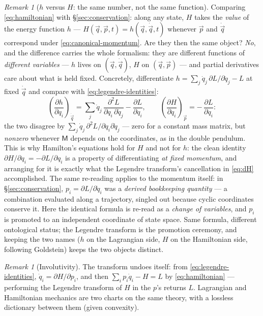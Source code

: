 \documentclass[11pt]{article}
\theoremstyle{plain}
\theoremstyle{definition}
\theoremstyle{remark}
\newtheorem{remark}[theorem]{Remark}
\newcommand{\pd}[2]{\frac{\partial #1}{\partial #2}}
\newcommand{\vq}{\vec{q}}
\newcommand{\vp}{\vec{p}}
\newcommand{\mM}{\mathsf{M}}
\begin{document}
\begin{remark}[$h$ versus $H$: the same number, not the same function]
\label{rem:h-vs-H}
Comparing \eqref{eq:hamiltonian} with \S\ref{sec:conservation}: along
any state, $H$ takes the \emph{value} of the energy function $h$ ---
$H(\vq, \vp, t) = h(\vq, \dot\vq, t)$ whenever $\vp$ and $\dot\vq$
correspond under \eqref{eq:canonical-momentum}. Are they then the same
object? \emph{No}, and the difference carries the whole formalism: they
are different functions of \emph{different variables} --- $h$ lives on
$(\vq, \dot\vq)$, $H$ on $(\vq, \vp)$ --- and partial derivatives care
about what is held fixed. Concretely, differentiate
$h = \sum_j \dot q_j\,\partial L/\partial\dot q_j - L$ at fixed
$\dot\vq$ and compare with \eqref{eq:legendre-identities}:
\begin{equation}
  \left(\pd{h}{q_i}\right)_{\!\dot\vq}
  = \sum_j \dot q_j\,
    \frac{\partial^2 L}{\partial q_i\,\partial \dot q_j}
  - \pd{L}{q_i},
  \qquad
  \left(\pd{H}{q_i}\right)_{\!\vp}
  = -\,\pd{L}{q_i} :
\end{equation}
the two disagree by
$\sum_j \dot q_j\,\partial^2 L/\partial q_i\partial\dot q_j$ ---
zero for a constant mass matrix, but \emph{nonzero} whenever
$\mM$ depends on the coordinates, as in the double pendulum. This is why
Hamilton's equations hold for $H$ and not for $h$: the clean identity
$\partial H/\partial q_i = -\partial L/\partial q_i$ is a property of
differentiating \emph{at fixed momentum}, and arranging for it is
exactly what the Legendre transform's cancellation in \eqref{eq:dH}
accomplished. The same re-reading applies to the momentum itself:
in \S\ref{sec:conservation}, $p_i = \partial L/\partial\dot q_i$ was a
\emph{derived bookkeeping quantity} --- a combination evaluated along a
trajectory, singled out because cyclic coordinates conserve it. Here the
identical formula is re-read as a \emph{change of variables}, and $p_i$
is promoted to an independent coordinate of state space. Same formula,
different ontological status; the Legendre transform is the promotion
ceremony, and keeping the two names ($h$ on the Lagrangian side, $H$ on
the Hamiltonian side, following Goldstein) keeps the two objects
distinct.
\end{remark}

\begin{remark}[Involutivity]
The transform undoes itself: from \eqref{eq:legendre-identities},
$\dot q_i = \partial H/\partial p_i$, and then
$\sum_i p_i \dot q_i - H = L$ by \eqref{eq:hamiltonian} --- performing the
Legendre transform of $H$ in the $p$'s returns $L$. Lagrangian and
Hamiltonian mechanics are two charts on the same theory, with a
lossless dictionary between them (given convexity).
\end{remark}
\end{document}
